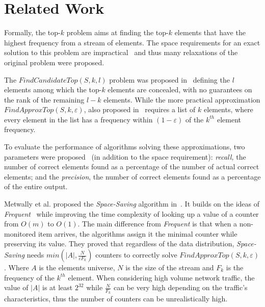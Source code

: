 \section{Related Work}
Formally, the top-$k$ problem aims at finding the top-$k$ elements that have the highest frequency from a stream of elements. The space requirements for an exact solution to this problem are impractical~\cite{Charikar2004} and thus many relaxations of the original problem were proposed.

The $FindCandidateTop(S, k, l)$ problem was proposed in~\cite{Charikar2004} defining the $l$ elements among which the top-$k$ elements are concealed, with no guarantees on the rank of the remaining $l-k$ elements. While the more practical approximation $FindApproxTop(S, k, \varepsilon)$, also proposed in~\cite{Charikar2004} requires a list of $k$ elements, where every element in the list has a frequency within $(1-\varepsilon)$ of the $k^{th}$ element frequency.

To evaluate the performance of algorithms solving these approximations, two parameters were proposed~\cite{Cormode2005} (in addition to the space requirement): \textit{recall,} the number of correct elements found as a percentage of the number of actual correct elements; and the \textit{precision}, the number of correct elements found as a percentage of the entire output.


Metwally et al. proposed the \textit{Space-Saving} algorithm in~\cite{Metwally2005}. It builds on the ideas of \textit{Frequent}~\cite{Demaine2002} while improving the time complexity of looking up a value of a counter from $O(m)$ to $O(1)$. The main difference from \textit{Frequent} is that when a non-monitored item arrives, the algorithms assign it the minimal counter while preserving its value. They proved that regardless of the data distribution, \textit{Space-Saving} needs $min(|A|,\frac{N}{\varepsilon F_k})$ counters to correctly solve $FindApproxTop(S, k, \varepsilon)$. Where $A$ is the elements universe, $N$ is the size of the stream and $F_k$ is the frequency of the $k^{th}$ element. When considering high volume network traffic, the value of $|A|$ is at least $2^{32}$ while $\frac{N}{F_k}$ can be very high depending on the traffic's characteristics, thus the number of counters can be unrealistically high.

